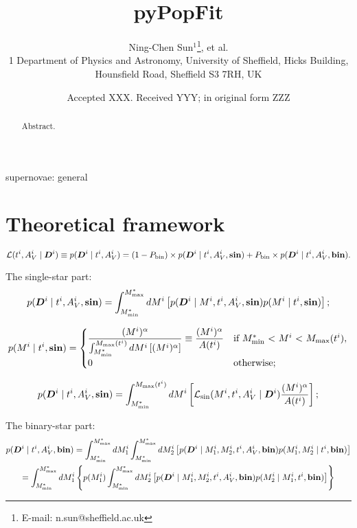\documentclass[a4paper,fleqn,usenatbib,onecolumn]{mnras}
\title[pyPopFit]{pyPopFit}
\author[Sun et al.]{Ning-Chen Sun$^1$\thanks{E-mail: n.sun@sheffield.ac.uk}, et al. \\
1 Department of Physics and Astronomy, University of Sheffield, Hicks Building, Hounsfield Road, Sheffield S3 7RH, UK \\}
\date{Accepted XXX. Received YYY; in original form ZZZ}
\begin{document}
\label{firstpage}
\pagerange{\pageref{firstpage}--\pageref{lastpage}}
\maketitle

\begin{abstract}
Abstract.
\end{abstract}

\begin{keywords}
supernovae: general
\end{keywords}

\section{Theoretical framework}

\begin{equation}
\mathcal{L}(t^i, A_V^i \mid \bm{D}^i ) \equiv p(\bm{D}^i \mid t^i, A_V^i) = (1-P_{\rm bin}) \times p(\bm{D}^i \mid t^i, A_V^i, {\rm \bf sin}) + P_{\rm bin} \times p(\bm{D}^i \mid t^i, A_V^i, {\rm \bf bin}).
\end{equation}

The single-star part:
\begin{equation}
p(\bm{D}^i \mid t^i, A_V^i, {\rm \bf sin}) = 
\int_{M^\ast_{\rm min}}^{M^\ast_{\rm max}} dM^i \left[ p(\bm{D}^i \mid M^i, t^i, A_V^i, {\rm \bf sin}) p(M^i \mid t^i, {\rm \bf sin}) \right];
\end{equation}

\begin{equation}
p(M^i \mid t^i, {\rm \bf sin}) = 
\begin{cases}
\dfrac{(M^i)^\alpha}{\int_{M^\ast_{\rm min}}^{M_{\rm max}(t^i)} dM^i \left[ (M^i)^\alpha \right]} \equiv \dfrac{(M^i)^\alpha}{A(t^i)} & \text{if $M^\ast_{\rm min}$~$<$~$M^i$~$<$~$M_{\rm max}(t^i)$}, \\
0 & \text{otherwise};
\end{cases}
\end{equation}

\begin{equation}
p(\bm{D}^i \mid t^i, A_V^i, {\rm \bf sin}) =
\int_{M^\ast_{\rm min}}^{M_{\rm max}(t^i)} dM^i \left[ \mathcal{L}_{\rm sin}(M^i, t^i, A_V^i \mid \bm{D}^i) \dfrac{(M^i)^\alpha}{A(t^i)} \right];
\end{equation}

The binary-star part:
\begin{multline}
p(\bm{D}^i \mid t^i, A_V^i, {\rm \bf bin}) = 
\int_{M^\ast_{\rm min}}^{M^\ast_{\rm max}} dM_1^i \int_{M^\ast_{\rm min}}^{M^\ast_{\rm max}} dM_2^i\left[ p(\bm{D}^i \mid M_1^i, M_2^i, t^i, A_V^i, {\rm \bf bin}) p(M_1^i, M_2^i \mid t^i, {\rm \bf bin}) \right] \\
= \int_{M^\ast_{\rm min}}^{M^{\ast}_{\rm max}} dM_1^i \left\{ p(M_1^i) \int_{M^\ast_{\rm min}}^{M^\ast_{\rm max}} dM_2^i\left[ p(\bm{D}^i \mid M_1^i, M_2^i, t^i, A_V^i, {\rm \bf bin}) p(M_2^i \mid  M_1^i, t^i, {\rm \bf bin}) \right] \right\}
\end{multline}
\end{document}
